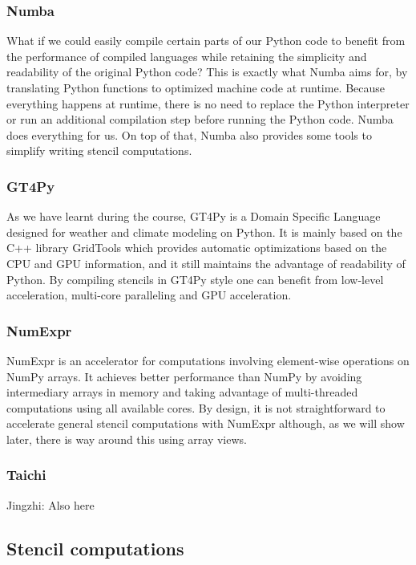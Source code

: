 \documentclass[12pt]{article}
\begin{document}
\subsubsection{Numba}

What if we could easily compile certain parts of our Python code to benefit from the performance of compiled languages while retaining the simplicity and readability of the original Python code? This is exactly what Numba aims for, by translating Python functions to optimized machine code at runtime. Because everything happens at runtime, there is no need to replace the Python interpreter or run an additional compilation step before running the Python code. Numba does everything for us. On top of that, Numba also provides some tools to simplify writing stencil computations.

\subsubsection{GT4Py}

As we have learnt during the course, GT4Py is a Domain Specific Language designed for weather and climate modeling on Python. It is mainly based on the C++ library GridTools which provides automatic optimizations based on the CPU and GPU information, and it still maintains the advantage of readability of Python. By compiling stencils in GT4Py style one can benefit from low-level acceleration, multi-core paralleling and GPU acceleration.

\subsubsection{NumExpr}

NumExpr is an accelerator for computations involving element-wise operations on NumPy arrays. It achieves better performance than NumPy by avoiding intermediary arrays in memory and taking advantage of multi-threaded computations using all available cores. By design, it is not straightforward to accelerate general stencil computations with NumExpr although, as we will show later, there is way around this using array views.

\subsubsection{Taichi}

{\color{red}Jingzhi: Also here}

\subsection{Stencil computations}
\end{document}
